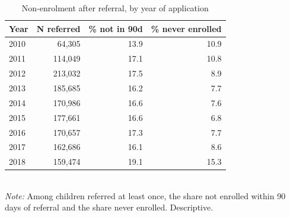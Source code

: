 \begin{table}[htbp]\centering
\caption{Non-enrolment after referral, by year of application}
\label{tab:B4_naomat_ano}
\small
\setlength{\tabcolsep}{4pt}
\begin{tabular}{lrrr}
\toprule
Year & N referred & \% not in 90d & \% never enrolled \\
\midrule
2010 & 64,305 & 13.9 & 10.9 \\
2011 & 114,049 & 17.1 & 10.8 \\
2012 & 213,032 & 17.5 & 8.9 \\
2013 & 185,685 & 16.2 & 7.7 \\
2014 & 170,986 & 16.6 & 7.6 \\
2015 & 177,661 & 16.6 & 6.8 \\
2016 & 170,657 & 17.3 & 7.7 \\
2017 & 162,686 & 16.1 & 8.6 \\
2018 & 159,474 & 19.1 & 15.3 \\
\bottomrule
\end{tabular}
\\[3pt]{\footnotesize \textit{Note:} Among children referred at least once, the share not enrolled within 90 days of referral and the share never enrolled. Descriptive.}
\end{table}
